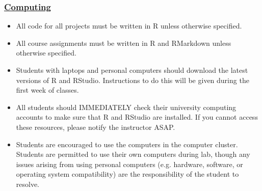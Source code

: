 \documentclass[11pt]{article}
\begin{document}
\subsubsection*{\underline{Computing}}
\begin{itemize}
	\item All code for all projects must be written in R unless otherwise specified.  
	
	\item All course assignments must be written in R and RMarkdown unless otherwise specified.
	
	\item Students with laptops and personal computers should download the latest versions of R and RStudio.  Instructions to do this will be given during the first week of classes.
	
	\item All students should IMMEDIATELY check their university computing accounts to make sure that R and RStudio are installed.  If you cannot access these resources, please notify the instructor ASAP.
	
	\item Students are encouraged to use the computers in the computer cluster.  Students are permitted to use their own computers during lab, though any issues arising from using personal computers (e.g. hardware, software, or operating system compatibility) are the responsibility of the student to resolve.
	
\end{itemize}
\end{document}
